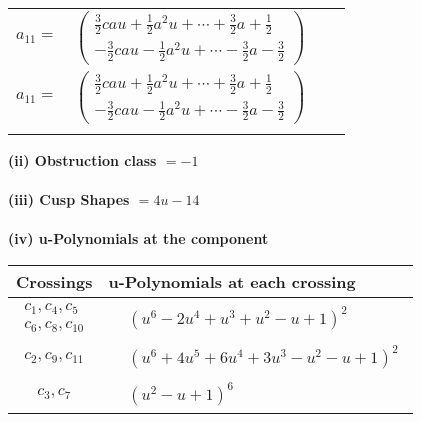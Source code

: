 \documentclass[1p]{elsarticle_modified}
\theoremstyle{definition}
\begin{document}
\begin{tabular}{m{7pt} m{180pt} m{7pt} m{180pt} }
\flushright $a_{11}=$&$\begin{pmatrix}\frac{3}{2} c a u+\frac{1}{2} a^2 u+\cdots+\frac{3}{2} a+\frac{1}{2}\\-\frac{3}{2} c a u-\frac{1}{2} a^2 u+\cdots-\frac{3}{2} a-\frac{3}{2}\end{pmatrix}$\\ \flushright $a_{11}=$&$\begin{pmatrix}\frac{3}{2} c a u+\frac{1}{2} a^2 u+\cdots+\frac{3}{2} a+\frac{1}{2}\\-\frac{3}{2} c a u-\frac{1}{2} a^2 u+\cdots-\frac{3}{2} a-\frac{3}{2}\end{pmatrix}$\\&\end{tabular}
\flushleft \textbf{(ii) Obstruction class $= -1$}\\~\\
\flushleft \textbf{(iii) Cusp Shapes $= 4 u-14$}\\~\\
\newpage\renewcommand{\arraystretch}{1}
\flushleft \textbf{(iv) u-Polynomials at the component}\newline \\
\begin{tabular}{m{50pt}|m{274pt}}
Crossings & \hspace{64pt}u-Polynomials at each crossing \\
\hline $$\begin{aligned}c_{1},c_{4},c_{5}\\c_{6},c_{8},c_{10}\end{aligned}$$&$\begin{aligned}
&(u^6-2 u^4+u^3+u^2- u+1)^2
\end{aligned}$\\
\hline $$\begin{aligned}c_{2},c_{9},c_{11}\end{aligned}$$&$\begin{aligned}
&(u^6+4 u^5+6 u^4+3 u^3- u^2- u+1)^2
\end{aligned}$\\
\hline $$\begin{aligned}c_{3},c_{7}\end{aligned}$$&$\begin{aligned}
&(u^2- u+1)^6
\end{aligned}$\\
\hline
\end{tabular}\\~\\
\newpage\renewcommand{\arraystretch}{1}
\end{document}
